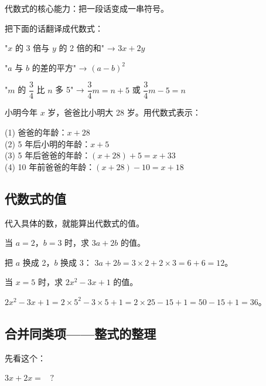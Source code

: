 代数式的核心能力：把一段话变成一串符号。

\begin{example}
把下面的话翻译成代数式：
\end{example}
\begin{solution}
"$x$ 的 3 倍与 $y$ 的 2 倍的和" → $3x + 2y$

"$a$ 与 $b$ 的差的平方" → $(a-b)^2$

"$m$ 的 $\dfrac{3}{4}$ 比 $n$ 多 5" → $\dfrac{3}{4}m = n + 5$ 或 $\dfrac{3}{4}m - 5 = n$
\end{solution}

\begin{example}
小明今年 $x$ 岁，爸爸比小明大 28 岁。用代数式表示：
\end{example}
\begin{solution}
(1) 爸爸的年龄：$x + 28$\\
(2) 5 年后小明的年龄：$x + 5$\\
(3) 5 年后爸爸的年龄：$(x + 28) + 5 = x + 33$\\
(4) 10 年前爸爸的年龄：$(x + 28) - 10 = x + 18$
\end{solution}

\subsection*{代数式的值}

代入具体的数，就能算出代数式的值。

\begin{example}
当 $a=2$，$b=3$ 时，求 $3a + 2b$ 的值。
\end{example}
\begin{solution}
把 $a$ 换成 2，$b$ 换成 3：
$3a + 2b = 3\times2 + 2\times3 = 6 + 6 = 12$。
\end{solution}

\begin{example}
当 $x=5$ 时，求 $2x^2 - 3x + 1$ 的值。
\end{example}
\begin{solution}
$2x^2 - 3x + 1 = 2\times5^2 - 3\times5 + 1 = 2\times25 - 15 + 1 = 50 - 15 + 1 = 36$。
\end{solution}

\subsection*{合并同类项——整式的整理}

先看这个：

$3x + 2x = \;\boxed{\;}\;?$

